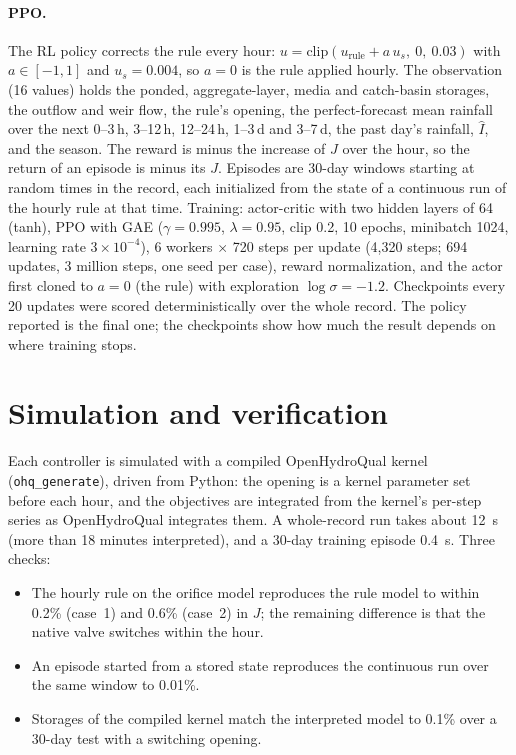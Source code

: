 \documentclass[11pt]{article}
\begin{document}
\paragraph{PPO.} The RL policy corrects the rule every hour:
$u = \mathrm{clip}(u_{\mathrm{rule}} + a\,u_s,\ 0,\ 0.03)$ with $a\in[-1,1]$ and
$u_s = 0.004$, so $a = 0$ is the rule applied hourly. The observation (16 values) holds the
ponded, aggregate-layer, media and catch-basin storages, the outflow and weir flow, the
rule's opening, the perfect-forecast mean rainfall over the next 0--3\,h, 3--12\,h,
12--24\,h, 1--3\,d and 3--7\,d, the past day's rainfall, $\hat I$, and the season. The reward
is minus the increase of $J$ over the hour, so the return of an episode is minus its $J$.
Episodes are 30-day windows starting at random times in the record, each initialized from
the state of a continuous run of the hourly rule at that time. Training: actor-critic with
two hidden layers of 64 (tanh), PPO with GAE ($\gamma = 0.995$, $\lambda = 0.95$, clip 0.2,
10 epochs, minibatch 1024, learning rate $3\times10^{-4}$), 6 workers $\times$ 720 steps per
update (4,320 steps; 694 updates, 3 million steps, one seed per case), reward normalization, and the actor first cloned to $a = 0$ (the rule) with
exploration $\log\sigma = -1.2$. Checkpoints every 20 updates were scored deterministically
over the whole record. The policy reported is the final one; the checkpoints show how
much the result depends on where training stops.

\section{Simulation and verification}
Each controller is simulated with a compiled OpenHydroQual kernel (\texttt{ohq\_generate}),
driven from Python: the opening is a kernel parameter set before each hour, and the
objectives are integrated from the kernel's per-step series as OpenHydroQual integrates
them. A whole-record run takes about \SI{12}{s} (more than 18 minutes interpreted), and a
30-day training episode \SI{0.4}{s}. Three checks:
\begin{itemize}
\item The hourly rule on the orifice model reproduces the rule model to within 0.2\% (case~1)
and 0.6\% (case~2) in $J$; the remaining difference is that the native valve switches within
the hour.
\item An episode started from a stored state reproduces the continuous run over the same
window to 0.01\%.
\item Storages of the compiled kernel match the interpreted model to 0.1\% over a 30-day
test with a switching opening.
\end{itemize}
\end{document}
